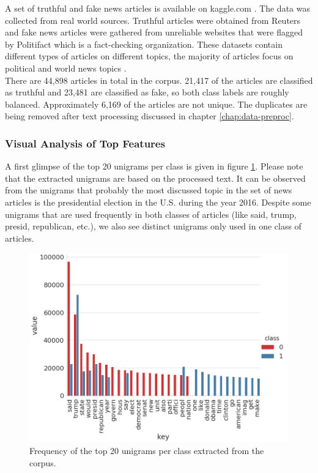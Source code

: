 \documentclass[a4paper,12pt,nottoc]{article}
\begin{document}
A set of truthful and fake news articles is available on kaggle.com \cite{bib:kaggle}. The data was collected from real world sources. Truthful articles were obtained from Reuters and fake news articles were gathered from unreliable websites that were flagged by Politifact which is a fact-checking organization. These datasets contain different types of articles on different topics, the majority of articles focus on political and world news topics \cite{bib:ahmed-2018}.\\

\noindent There are 44,898 articles in total in the corpus. 21,417 of the articles are classified as truthful and 23,481 are classified as fake, so both class labels are roughly balanced. Approximately 6,169 of the articles are not unique. The duplicates are being removed after text processing discussed in chapter \ref{chap:data-preproc}.

\subsubsection{Visual Analysis of Top Features}

A first glimpse of the top 20 unigrams per class is given in figure \ref{fig:top20}. Please note that the extracted unigrams are based on the processed text. It can be observed from the unigrams that probably the most discussed topic in the set of news articles is the presidential election in the U.S. during the year 2016. Despite some unigrams that are used frequently in both classes of articles (like said, trump, presid, republican, etc.), we also see distinct unigrams only used in one class of articles.

\begin{figure}[h]
\includegraphics[width=14cm]{output/word_analysis_1.png}
\centering
\caption{Frequency of the top 20 unigrams per class extracted from the corpus.}\label{fig:top20}
\end{figure}
\end{document}
